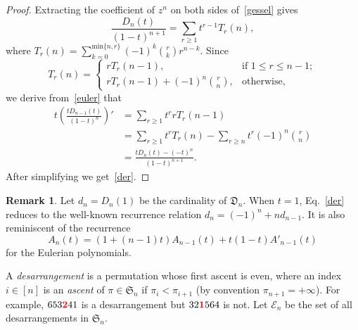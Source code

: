 \documentclass[12pt]{amsart}
\numberwithin{equation}{section}
\def\red{\textcolor{red}}
\theoremstyle{plain}
\theoremstyle{definition}
\newtheorem{remark}[theorem]{Remark}
\def\min{\mathrm{min}}
\def\S{\mathfrak{S}}
\def\D{\mathfrak{D}}
\def\E{\mathcal{E}}
\begin{document}
 \begin{proof}
 Extracting the coefficient of $z^n$ on both sides of~\eqref{gessel} gives
 \begin{equation}\label{euler}
 \frac{D_n(t)}{(1-t)^{n+1}}=\sum_{r\geq1}t^{r-1}T_r(n),%
 \end{equation}
 where %
$T_r(n)=\sum_{k=0}^{\min\{n,r\}}(-1)^k{r\choose k}r^{n-k}$. Since
 $$
 T_r(n)=
 \begin{cases}
 rT_r(n-1), &\text{if $1\leq r\leq n-1$};\\
 rT_r(n-1)+(-1)^n{r\choose n}, &\text{otherwise},
 \end{cases}
 $$
we derive  from~\eqref{euler} that 
 \begin{align*}
 t\left(\frac{tD_{n-1}(t)}{(1-t)^n}\right)'&=\sum_{r\geq1}t^rrT_r(n-1)\\
 &=\sum_{r\geq1}t^rT_r(n)-\sum_{r\geq n}t^r(-1)^n{r\choose n}\\
 &=\frac{tD_n(t)-(-t)^n}{(1-t)^{n+1}}.
 \end{align*}
 After simplifying we get~\eqref{der}.
 \end{proof}
 \begin{remark} Let $d_n=D_n(1)$ be the cardinality of  $\D_n$. 
 When $t=1$, Eq.~\eqref{der} reduces to the well-known recurrence relation 
$ d_n=(-1)^n+nd_{n-1}$.
It is also reminiscent of the recurrence 
 \begin{equation}\label{rec:euler}
 A_n(t)=(1+(n-1)t)A_{n-1}(t)+t(1-t)A'_{n-1}(t)
 \end{equation}
for the Eulerian polynomials.
 \end{remark}
 
 
 A {\em desarrangement} is a permutation whose first ascent is  even, where an index $i\in[n]$ is an {\em ascent} of $\pi\in\S_n$ if $\pi_i<\pi_{i+1}$ (by convention $\pi_{n+1}=+\infty$). For example, $653\red{\bf2}41$ is a desarrangement but $32\red{\bf1}564$ is not.  
 Let  $\E_n$ be the set of all desarrangements in $\S_n$.
 
\end{document}
